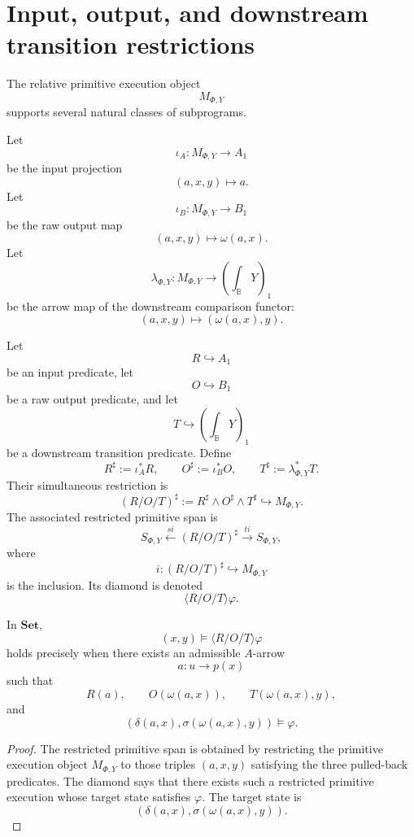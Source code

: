 \section{Input, output, and downstream transition restrictions}
\label{sec:input-output-downstream-restrictions}

The relative primitive execution object
\[
M_{\Phi,Y}
\]
supports several natural classes of subprograms.

Let
\[
\iota_A:M_{\Phi,Y}\to A_1
\]
be the input projection
\[
(a,x,y)\mapsto a.
\]
Let
\[
\iota_B:M_{\Phi,Y}\to B_1
\]
be the raw output map
\[
(a,x,y)\mapsto \omega(a,x).
\]
Let
\[
\lambda_{\Phi,Y}:M_{\Phi,Y}\to
\left(\int_{\mathbb B}Y\right)_1
\]
be the arrow map of the downstream comparison functor:
\[
(a,x,y)\mapsto(\omega(a,x),y).
\]

\begin{definition}
\label{def:restricted-relative-subprogram}
Let
\[
R\hookrightarrow A_1
\]
be an input predicate, let
\[
O\hookrightarrow B_1
\]
be a raw output predicate, and let
\[
T\hookrightarrow \left(\int_{\mathbb B}Y\right)_1
\]
be a downstream transition predicate. Define
\[
R^\sharp:=\iota_A^\ast R,
\qquad
O^\sharp:=\iota_B^\ast O,
\qquad
T^\sharp:=\lambda_{\Phi,Y}^\ast T.
\]
Their simultaneous restriction is
\[
(R/O/T)^\sharp
:=
R^\sharp\wedge O^\sharp\wedge T^\sharp
\hookrightarrow M_{\Phi,Y}.
\]
The associated restricted primitive span is
\[
S_{\Phi,Y}
\xleftarrow{s i}
(R/O/T)^\sharp
\xrightarrow{t i}
S_{\Phi,Y},
\]
where
\[
i:(R/O/T)^\sharp\hookrightarrow M_{\Phi,Y}
\]
is the inclusion. Its diamond is denoted
\[
\langle R/O/T\rangle\varphi.
\]
\end{definition}

\begin{proposition}
\label{prop:external-reading-relative-restricted}
In \(\mathbf{Set}\),
\[
(x,y)\models \langle R/O/T\rangle\varphi
\]
holds precisely when there exists an admissible \(A\)-arrow
\[
a:u\to p(x)
\]
such that
\[
R(a),
\qquad
O(\omega(a,x)),
\qquad
T(\omega(a,x),y),
\]
and
\[
\left(
\delta(a,x),
\sigma(\omega(a,x),y)
\right)
\models\varphi.
\]
\end{proposition}

\begin{proof}
The restricted primitive span is obtained by restricting the primitive
execution object \(M_{\Phi,Y}\) to those triples \((a,x,y)\) satisfying the
three pulled-back predicates. The diamond says that there exists such a
restricted primitive execution whose target state satisfies \(\varphi\). The
target state is
\[
\left(
\delta(a,x),
\sigma(\omega(a,x),y)
\right).
\]
\end{proof}

